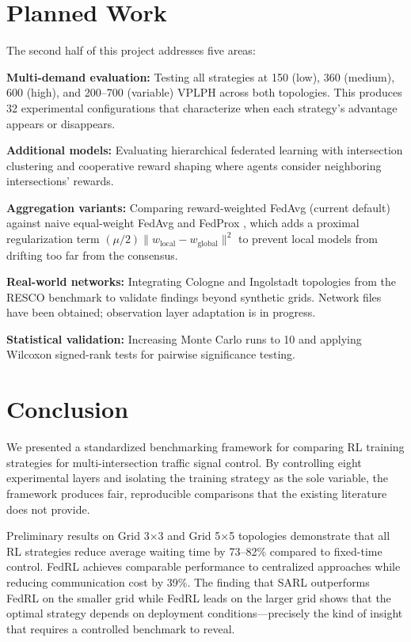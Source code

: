 \documentclass[conference]{IEEEtran}
\begin{document}
\section{Planned Work}

The second half of this project addresses five areas:

\textbf{Multi-demand evaluation:} Testing all strategies at 150 (low), 360 (medium), 600 (high), and 200--700 (variable) VPLPH across both topologies. This produces 32 experimental configurations that characterize when each strategy's advantage appears or disappears.

\textbf{Additional models:} Evaluating hierarchical federated learning with intersection clustering and cooperative reward shaping where agents consider neighboring intersections' rewards.

\textbf{Aggregation variants:} Comparing reward-weighted FedAvg (current default) against naive equal-weight FedAvg and FedProx \cite{b_fedprox}, which adds a proximal regularization term $(\mu/2) \|w_{\text{local}} - w_{\text{global}}\|^2$ to prevent local models from drifting too far from the consensus.

\textbf{Real-world networks:} Integrating Cologne and Ingolstadt topologies from the RESCO benchmark \cite{b_resco} to validate findings beyond synthetic grids. Network files have been obtained; observation layer adaptation is in progress.

\textbf{Statistical validation:} Increasing Monte Carlo runs to 10 and applying Wilcoxon signed-rank tests for pairwise significance testing.

\section{Conclusion}

We presented a standardized benchmarking framework for comparing RL training strategies for multi-intersection traffic signal control. By controlling eight experimental layers and isolating the training strategy as the sole variable, the framework produces fair, reproducible comparisons that the existing literature does not provide.

Preliminary results on Grid 3$\times$3 and Grid 5$\times$5 topologies demonstrate that all RL strategies reduce average waiting time by 73--82\% compared to fixed-time control. FedRL achieves comparable performance to centralized approaches while reducing communication cost by 39\%. The finding that SARL outperforms FedRL on the smaller grid while FedRL leads on the larger grid shows that the optimal strategy depends on deployment conditions---precisely the kind of insight that requires a controlled benchmark to reveal.
\end{document}
